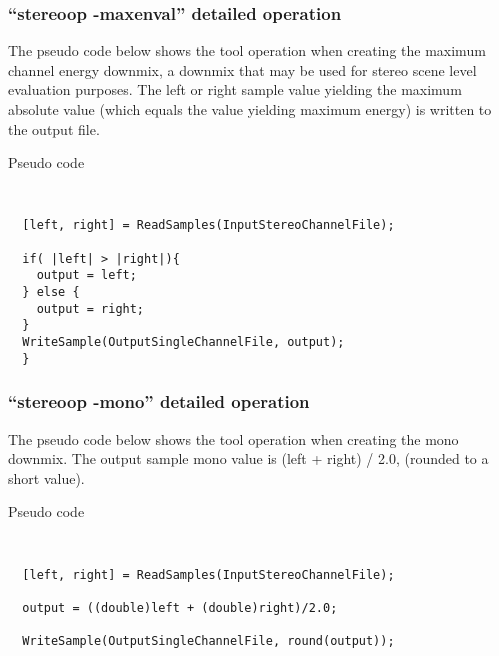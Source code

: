 
\subsubsection{``stereoop -maxenval'' detailed operation}

The pseudo code below shows the tool operation when creating the
maximum channel energy downmix, a downmix that may be used for stereo
scene level evaluation purposes. The left or right sample value
yielding the maximum absolute value (which equals the value yielding
maximum energy) is written to the output file.

Pseudo code
{\tt\small
\begin{verbatim}
  [left, right] = ReadSamples(InputStereoChannelFile);

  if( |left| > |right|){
    output = left;
  } else {
    output = right;
  }
  WriteSample(OutputSingleChannelFile, output);
  }
\end{verbatim}}

\subsubsection{``stereoop -mono'' detailed operation}
The pseudo code below shows the tool operation when creating the mono
downmix. The output sample mono value is (left + right) / 2.0,
(rounded to a short value).

Pseudo code
{\tt\small
\begin{verbatim}
  [left, right] = ReadSamples(InputStereoChannelFile);

  output = ((double)left + (double)right)/2.0;

  WriteSample(OutputSingleChannelFile, round(output));
\end{verbatim}}

